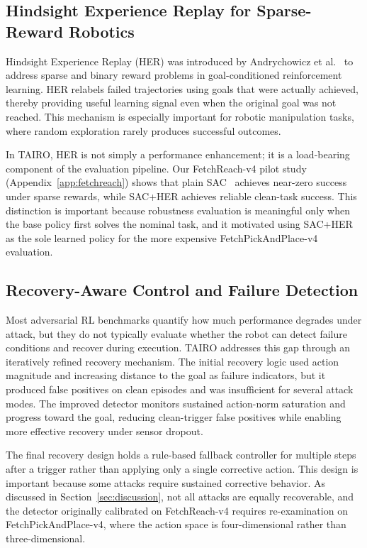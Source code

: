\documentclass[conference]{IEEEtran}
\begin{document}
\subsection{Hindsight Experience Replay for Sparse-Reward Robotics}

Hindsight Experience Replay (HER) was introduced by Andrychowicz et
al.~\cite{andrychowicz2017hindsight} to address sparse and binary reward problems in
goal-conditioned reinforcement learning. HER relabels failed trajectories using goals
that were actually achieved, thereby providing useful learning signal even when the
original goal was not reached. This mechanism is especially important for robotic
manipulation tasks, where random exploration rarely produces successful outcomes.

In TAIRO, HER is not simply a performance enhancement; it is a load-bearing component of
the evaluation pipeline. Our FetchReach-v4 pilot study (Appendix~\ref{app:fetchreach})
shows that plain SAC~\cite{haarnoja2018soft} achieves near-zero success under sparse
rewards, while SAC+HER achieves reliable clean-task success. This distinction is
important because robustness evaluation is meaningful only when the base policy first
solves the nominal task, and it motivated using SAC+HER as the sole learned policy for
the more expensive FetchPickAndPlace-v4 evaluation.

\subsection{Recovery-Aware Control and Failure Detection}

Most adversarial RL benchmarks quantify how much performance degrades under attack, but
they do not typically evaluate whether the robot can detect failure conditions and
recover during execution. TAIRO addresses this gap through an iteratively refined
recovery mechanism. The initial recovery logic used action magnitude and increasing
distance to the goal as failure indicators, but it produced false positives on clean
episodes and was insufficient for several attack modes. The improved detector monitors
sustained action-norm saturation and progress toward the goal, reducing clean-trigger
false positives while enabling more effective recovery under sensor dropout.

The final recovery design holds a rule-based fallback controller for multiple steps
after a trigger rather than applying only a single corrective action. This design is
important because some attacks require sustained corrective behavior. As discussed in
Section~\ref{sec:discussion}, not all attacks are equally recoverable, and the detector
originally calibrated on FetchReach-v4 requires re-examination on FetchPickAndPlace-v4,
where the action space is four-dimensional rather than three-dimensional.
\end{document}
